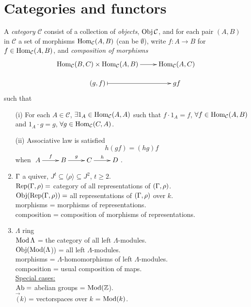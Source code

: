 
\section{Categories and functors} 
\begin{defin}
  A \emph{category} $\mathcal{C}$ consist of a collection of
  \emph{objects}, $\operatorname{Obj}\mathcal{C}$, and for each pair $(A,B)$ in
  $\mathcal{C}$ a set of morphisms $\operatorname{Hom}_\mathcal{C}(A,B)$ (can be
  $\emptyset$), write $f\colon A\to B$ for
  $f \in \operatorname{Hom}_\mathcal{C}(A,B)$, and \emph{composition of
    morphisms}
\[\xymatrix@R-1pc{
\Hom_\mathcal{C}(B,C) \times \Hom_\mathcal{C}(A, B) \ar[r] & \Hom_\mathcal{C}(A, C)\\
(g,f) \ar@{|->}[r]& gf
}\]
such that
\begin{enumerate}
\item[(i)] For each $A \in \mathcal{C}$,
  $\exists 1_A \in \operatorname{Hom}_\mathcal{C}(A,A)$ such that $f \cdot 1_A = f$,
  $\forall f \in \operatorname{Hom}_\mathcal{C}(A,B)$ and $1_A \cdot g = g$,
  $\forall g \in \operatorname{Hom}_\mathcal{C}(C, A)$.
\item[(ii)] Associative law is satisfied \[h(gf) = (hg)f\] when
  $\xymatrix{A \ar[r]^f & B \ar[r]^g & C \ar[r]^h & D}$.
\end{enumerate}
\end{defin}

\begin{exam}
\begin{enumerate}
\item[]
\item $\Gamma$ a quiver, $J^t \subseteq \langle \rho \rangle \subseteq J^2$, $t \geq 2$.\\
  $\operatorname{Rep}(\Gamma, \rho) = $ category of all representations of $(\Gamma, \rho)$.\\
  $\operatorname{Obj}(\operatorname{Rep}(\Gamma, \rho)) = $ all representations of $(\Gamma, \rho)$ over $k$.\\
  morphisms = morphisms of representations.\\
  composition = composition of morphisms of representations.

\item $\Lambda$ ring\\
$\operatorname{Mod}\Lambda$ = the category of all left $\Lambda$-modules.\\
$\operatorname{Obj}(\operatorname{Mod}(\Lambda$)) = all left $\Lambda$-modules.\\
morphisms = $\Lambda$-homomorphisms of left $\Lambda$-modules.\\
composition = usual composition of maps.\\
\underline{Special cases:}\\
$\operatorname{Ab}\nolimits = $ abelian groups = $\operatorname{Mod}(\mathbb{Z}$).\\
$\Vec(k)$ = vectorspaces over $k$ = $\operatorname{Mod}(k)$.
\end{enumerate}
\end{exam}


